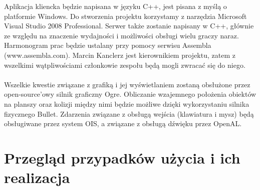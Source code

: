 \documentclass[12pt,a4paper,twoside]{article}
\begin{document}
Aplikacja kliencka będzie napisana w języku C++, jest pisana z myślą o platformie Windows. Do stworzenia projektu korzystamy z narzędzia Microsoft Visual Studio 2008 Professional. Serwer także zostanie napisany w C++, głównie ze względu na znaczenie wydajności i możliwości obsługi wielu graczy naraz. Harmonogram prac będzie ustalany przy pomocy serwisu Assembla (www.assembla.com). Marcin Kanclerz jest kierownikiem projektu, zatem z wszelkimi wątpliwościami członkowie zespołu będą mogli zwracać się do niego.\\
\\
Wszelkie kwestie związane z grafiką i jej wyświetlaniem zostaną obsłużone przez open-source'owy silnik graficzny Ogre. Obliczanie wzajemnego położenia obiektów na planszy oraz kolizji między nimi będzie możliwe dzięki wykorzystaniu silnika fizycznego Bullet. Zdarzenia związane z obsługą wejścia (klawiatura i mysz) będą obsługiwane przez system OIS, a związane z obsługą dźwięku przez OpenAL.

\section{Przegląd przypadków użycia i ich realizacja}

\end{document}
